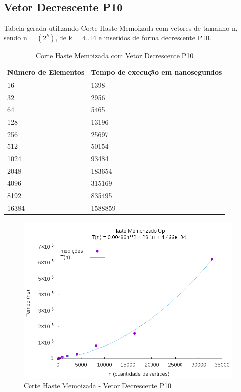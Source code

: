 \documentclass[12pt,a4paper,twoside]{report}
\begin{document}
\subsection{Vetor Decrescente P10}
Tabela gerada utilizando Corte Haste Memoizada com vetores de tamanho n, sendo n = $(2^k)$, de k = 4..14 e inseridos de forma decrescente P10.
\begin{table}[H]
\centering
\caption{Corte Haste Memoizada com Vetor Decrescente P10}
\label{my-label}
\begin{tabular}{|l|l|}
\hline
\multicolumn{1}{|c|}{\textbf{Número de Elementos}} & \multicolumn{1}{c|}{\textbf{Tempo de execução em nanosegundos}} \\ \hline
16 & 1398 \\ \hline
32 & 2956 \\ \hline
64 & 5465 \\ \hline
128 & 13196 \\ \hline
256 & 25697 \\ \hline
512 & 50154 \\ \hline
1024 & 93484 \\ \hline
2048 & 183654 \\ \hline
4096 & 315169 \\ \hline
8192 & 835495 \\ \hline
16384 & 1588859 \\ \hline

\end{tabular}
\end{table}

\begin{figure}[H]
    \centering
    \includegraphics[width=0.7\linewidth]{graficos/CorteHasteMemorizado/DecrescenteP10/HasteMemo.png}
  \caption{Corte Haste Memoizada - Vetor Decrescente P10}
\end{figure}
\end{document}
